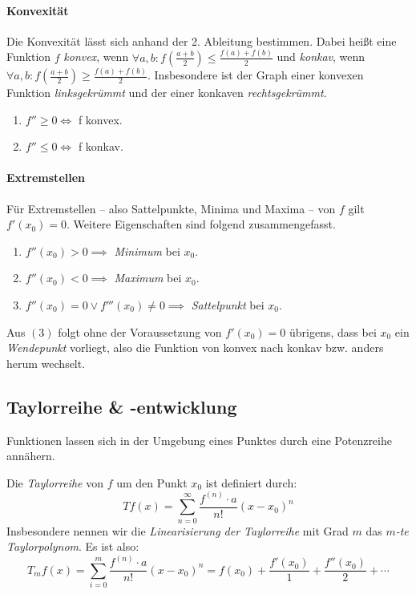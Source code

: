 \documentclass[a4paper, 9pt, DIV=24]{scrartcl}
\begin{document}
\paragraph{Konvexität}
Die Konvexität lässt sich anhand der 2. Ableitung bestimmen.
Dabei heißt eine Funktion $f$ \emph{konvex}, wenn $\forall a,b: f(\frac{a+b}{2}) \leq \frac{f(a)+f(b)}{2}$
und \emph{konkav}, wenn $\forall a,b: f(\frac{a+b}{2}) \geq \frac{f(a)+f(b)}{2}$.
Insbesondere ist der Graph einer konvexen Funktion \emph{linksgekrümmt} und der einer konkaven \emph{rechtsgekrümmt}.
\begin{enumerate}[label={(}\arabic*{)}]
 \item $f'' \geq 0 \iff $ f konvex.
 \item $f'' \leq 0 \iff $ f konkav.
\end{enumerate}

\paragraph{Extremstellen}
Für Extremstellen -- also Sattelpunkte, Minima und Maxima -- von $f$ gilt $f'(x_0) = 0$.
Weitere Eigenschaften sind folgend zusammengefasst.
\begin{enumerate}[label={(}\arabic*{)}]
 \item $f''(x_0) > 0 \implies$ \emph{Minimum} bei $x_0$.
 \item $f''(x_0) < 0 \implies$ \emph{Maximum} bei $x_0$.
 \item $f''(x_0) = 0 \vee f'''(x_0) \neq 0 \implies$ \emph{Sattelpunkt} bei $x_0$.
\end{enumerate}

Aus $(3)$ folgt ohne der Voraussetzung von $f'(x_0) = 0$ übrigens, dass bei $x_0$ ein \emph{Wendepunkt} vorliegt,
also die Funktion von konvex nach konkav bzw. anders herum wechselt.

\subsection{Taylorreihe \& -entwicklung}
Funktionen lassen sich in der Umgebung eines Punktes durch eine Potenzreihe annähern.

Die \emph{Taylorreihe} von $f$ um den Punkt $x_0$ ist definiert durch:
\[ T f(x) = \sum_{n=0}^{\infty} \dfrac{f^{(n)}\cdot a}{n!}(x-x_0)^n \]
Insbesondere nennen wir die \emph{Linearisierung der Taylorreihe} mit Grad $m$ das \emph{$m$-te Taylorpolynom}.
Es ist also:
\[ T_m f(x) = \sum_{i=0}^{m} \dfrac{f^{(n)}\cdot a}{n!}(x-x_0)^n = f(x_0) + \dfrac{f'(x_0)}{1} + \dfrac{f''(x_0)}{2} + \cdots\]
\end{document}
